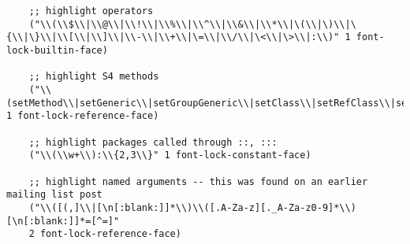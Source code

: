 \documentclass[11pt]{article}
\begin{document}
\begin{verbatim}
	;; highlight operators
	("\\(\\$\\|\\@\\|\\!\\|\\%\\|\\^\\|\\&\\|\\*\\|\(\\|\)\\|\{\\|\}\\|\\[\\|\\]\\|\\-\\|\\+\\|\=\\|\\/\\|\<\\|\>\\|:\\)" 1 font-lock-builtin-face)

	;; highlight S4 methods
	("\\(setMethod\\|setGeneric\\|setGroupGeneric\\|setClass\\|setRefClass\\|setReplaceMethod\\)" 1 font-lock-reference-face)

	;; highlight packages called through ::, :::
	("\\(\\w+\\):\\{2,3\\}" 1 font-lock-constant-face)

	;; highlight named arguments -- this was found on an earlier mailing list post
	("\\([(,]\\|[\n[:blank:]]*\\)\\([.A-Za-z][._A-Za-z0-9]*\\)[\n[:blank:]]*=[^=]"
	2 font-lock-reference-face)


\end{verbatim}
\end{document}
